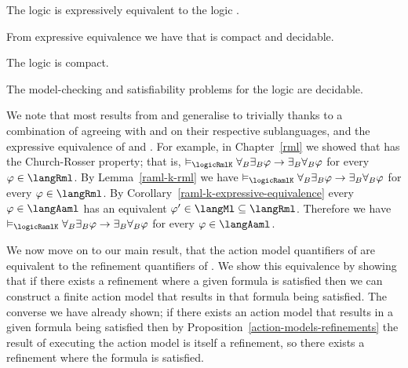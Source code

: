 \begin{corollary}\label{raml-k-expressive-equivalence}
The logic \logicRamlK{} is expressively equivalent to the logic \logicK{}.
\end{corollary}

From expressive equivalence we have that \logicRamlK{} is compact and decidable.

\begin{corollary}
The logic \logicRamlK{} is compact.
\end{corollary}

\begin{corollary}
The model-checking and satisfiability problems for the logic \logicRamlK{} are decidable.
\end{corollary}

We note that most results from \logicAmlK{} and \logicRmlK{} generalise to \logicRamlK{} trivially thanks to a combination of \logicRamlK{} agreeing with \logicAmlK{} and \logicRmlK{} on their respective sublanguages, and the expressive equivalence of \logicRamlK{} and \logicK{}.
For example, in Chapter~\ref{rml} we showed that \logicRmlK{} has the Church-Rosser property; that is, $\entails_\logicRmlK \allrefsBs \somerefsBs \phi \implies \somerefsBs \allrefsBs \phi$ for every $\phi \in \langRml$.
By Lemma~\ref{raml-k-rml} we have $\entails_\logicRamlK \allrefsBs \somerefsBs \phi \implies \somerefsBs \allrefsBs \phi$ for every $\phi \in \langRml$.
By Corollary~\ref{raml-k-expressive-equivalence} every $\phi \in \langAaml$ has an equivalent $\phi' \in \langMl \subseteq \langRml$.
Therefore we have $\entails_\logicRamlK \allrefsBs \somerefsBs \phi \implies \somerefsBs \allrefsBs \phi$ for every $\phi \in \langAaml$.

We now move on to our main result, that the action model quantifiers of \logicAamlK{} are equivalent to the refinement quantifiers of \logicRmlK{}.
We show this equivalence by showing that if there exists a refinement where a given formula is satisfied then we can construct a finite action model that results in that formula being satisfied.
The converse we have already shown; if there exists an action model that results in a given formula being satisfied then by Proposition~\ref{action-models-refinements} the result of executing the action model is itself a refinement, so there exists a refinement where the formula is satisfied.

